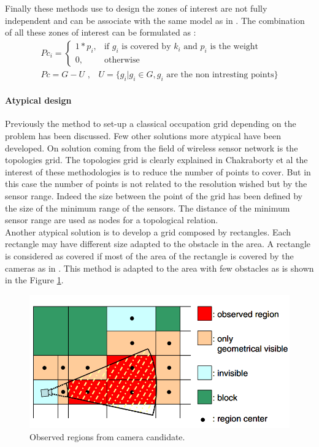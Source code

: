Finally  these methods use to design the zones of interest are not fully independent and can be associate with the same model as in \cite{141*akbarzadeh2013,171*horster2006,84*xu2011}. The combination of all these  zones of interest can be formulated as : 
 \begin{align}\label{eq:PcFull}
Pc_i= \begin{cases} 1*p_i, & \mbox{if } g_i\mbox{ is covered  by $k_i$ and  $p_i$ is the weight} \\ 0, & \mbox{otherwise}  \end{cases}
\\ Pc=G-U \mbox{ ,    }  \mbox{ }U= \{ g_i | g_i \in G, g_i \mbox{ are the non intresting points} \}
\end{align}

   
\paragraph*{Atypical design}  

Previously the method to set-up a classical occupation grid depending on the problem has been discussed. Few other solutions more atypical have been developed. On solution coming from the field of wireless sensor network is the topologies grid. 
 The topologies grid is clearly explained in Chakraborty et al \cite{150*chakrabarty2002} the interest of these methodologies is to reduce the number of points to cover. But in this case the number of points is not related to the resolution wished  but by the sensor range. Indeed the size between the point of the grid has been defined by the size of the minimum range of the sensors. The distance of the minimum sensor range are used as nodes for a topological relation. \\
Another atypical solution is to develop a grid composed by rectangles. Each rectangle may have different size adapted to the obstacle in the area. A rectangle is considered as covered if most of the area of the rectangle is covered by the cameras as in \citep{170*yabuta2008}. This method is adapted to the area with few obstacles as is shown in the Figure \ref{fig:from170}.
\begin{figure}[t!]
\begin{center}
   \includegraphics[width=\linewidth]{img/from170.png}
  \caption{ Observed regions from camera candidate.}\label{fig:from170}
  \endminipage\hfill
  \end{center}
\end{figure}

